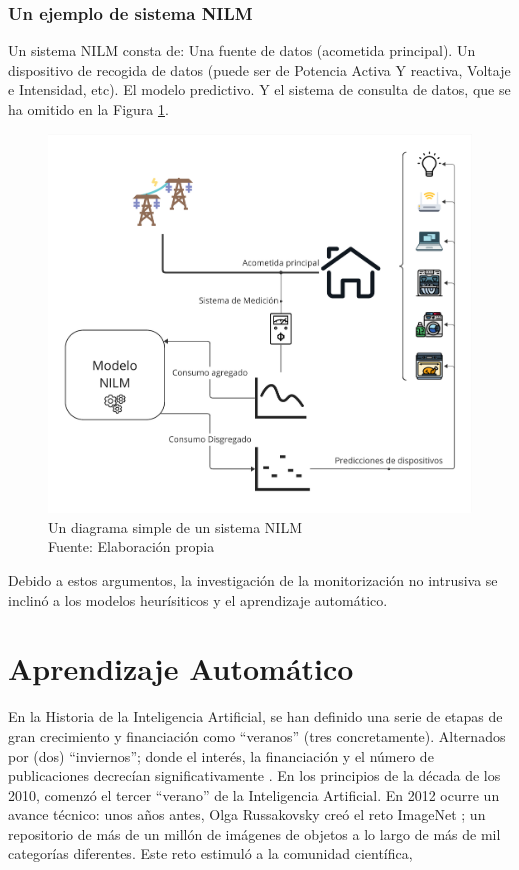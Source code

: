 \subsubsection{Un ejemplo de sistema NILM}
Un sistema NILM consta de: Una fuente de datos (acometida principal). Un dispositivo de recogida de datos (puede ser de Potencia Activa Y reactiva, Voltaje e Intensidad, etc). El modelo predictivo. Y el sistema de consulta de datos, que se ha omitido en la Figura \ref{diagramaNILM}.
\begin{figure}
    \centering
    \includegraphics[width=450px]{images/SistemaNILM.pdf}
    \caption{Un diagrama simple de un sistema NILM \\ Fuente: Elaboración propia}
    \label{diagramaNILM}
\end{figure}

Debido a estos argumentos, la investigación de la monitorización no intrusiva se inclinó a los modelos heurísiticos y el aprendizaje automático.


\section{Aprendizaje Automático}

En la Historia de la Inteligencia Artificial, se han definido una serie de etapas de gran crecimiento y financiación como  \foreignquote{spanish}{veranos} (tres concretamente). Alternados por (dos) \foreignquote{spanish}{inviernos}; donde el interés, la financiación y el número de publicaciones decrecían significativamente \autocite{briefAIHistory}.
En los principios de la década de los 2010, comenzó el tercer \enquote{verano} de la Inteligencia Artificial. En 2012 ocurre un avance técnico: unos años antes, Olga Russakovsky creó el reto ImageNet \autocite{ImageNetRussakovsky}; un repositorio de más de un millón de imágenes de objetos a lo largo de más de mil categorías diferentes. 
Este reto estimuló a la comunidad científica, 

